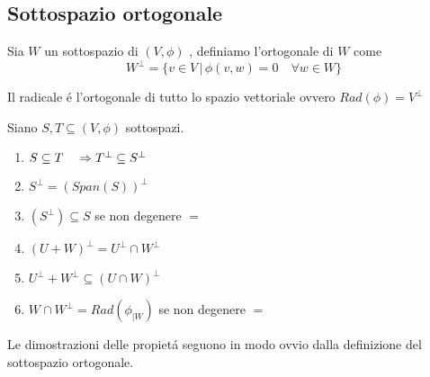 \subsection{Sottospazio ortogonale}
\begin{defn}\bianco
Sia $W$ un sottospazio di $(V,\phi)$ , definiamo l'ortogonale di $W$ come 
$$W^\perp =\{ v \in V \, \vert \, \phi(v,w) = 0 \quad \forall w\in W\} $$
\end{defn}
\begin{oss}Il radicale \'e l'ortogonale di tutto lo spazio vettoriale ovvero $Rad (\phi) = V^\perp $
\end{oss}
\begin{prop}\bianco
Siano $S,T\subseteq (V,\phi) $ sottospazi.
\begin{enumerate}
\item $ S\subseteq T \quad \Rightarrow T^\perp \subseteq S^\perp$
\item $S^\perp = \left( Span(S) \right)^\perp$
\item $\left( S^\perp \right) \subseteq S $ se non degenere $=$
\item $ ( U+W)^\perp = U^\perp \cap W^\perp $
\item $U^\perp + W ^\perp \subseteq ( U \cap W) ^\perp $
\item $ W \cap W^\perp = Rad (\phi_{\vert W})$ se non degenere $=$
\end{enumerate}
\proof Le dimostrazioni delle propiet\'a seguono in modo ovvio dalla definizione del sottospazio ortogonale.
\end{prop}
